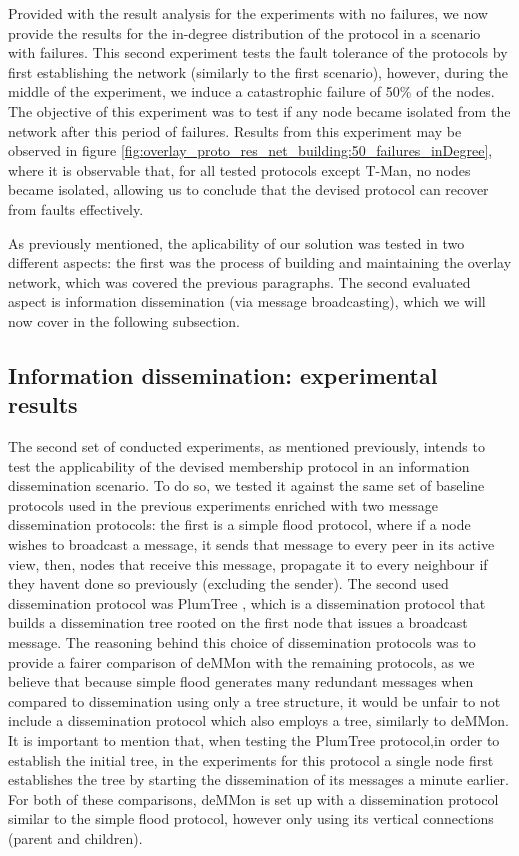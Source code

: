 Provided with the result analysis for the experiments with no failures, we now provide the results for the in-degree distribution of the protocol in a scenario with failures. This second experiment tests the fault tolerance of the protocols by first establishing the network (similarly to the first scenario), however, during the middle of the experiment, we induce a catastrophic failure of 50\% of the nodes. The objective of this experiment was to test if any node became isolated from the network after this period of failures. Results from this experiment may be observed in figure \ref{fig:overlay_proto_res_net_building:50_failures_inDegree}, where it is observable that, for all tested protocols except T-Man, no nodes became isolated, allowing us to conclude that the devised protocol can recover from faults effectively.

As previously mentioned, the aplicability of our solution was tested in two different aspects: the first was the process of building and maintaining the overlay network, which was covered the previous paragraphs. The second evaluated aspect is information dissemination (via message broadcasting), which we will now cover in the following subsection.


\subsection{Information dissemination: experimental results}

The second set of conducted experiments, as mentioned previously, intends to test the applicability of the devised membership protocol in an information dissemination scenario. To do so, we tested it against the same set of baseline protocols used in the previous experiments enriched with two message dissemination protocols: the first is a simple flood protocol, where if a node wishes to broadcast a message, it sends that message to every peer in its active view, then, nodes that receive this message, propagate it to every neighbour if they havent done so previously (excluding the sender). The second used dissemination protocol was PlumTree , which is a dissemination protocol that builds a dissemination tree rooted on the first node that issues a broadcast message. The reasoning behind this choice of dissemination protocols was to provide a fairer comparison of deMMon with the remaining protocols, as we believe that because simple flood generates many redundant messages when compared to dissemination using only a tree structure, it would be unfair to not include a dissemination protocol which also employs a tree, similarly to deMMon. It is important to mention that, when testing the PlumTree protocol,in order to establish the initial tree, in the experiments for this protocol a single node first establishes the tree by starting the dissemination of its messages a minute earlier. For both of these comparisons, deMMon is set up with a dissemination protocol similar to the simple flood protocol, however only using its vertical connections (parent and children).

